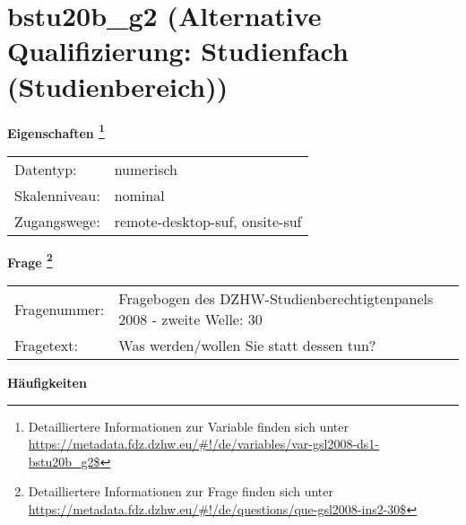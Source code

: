 
    \setcounter{footnote}{0}

    \vspace*{-1.8cm}
	\section{bstu20b\_g2 (Alternative Qualifizierung: Studienfach (Studienbereich))}
	\label{section:bstu20b_g2}



    \vspace*{0.5cm}
    \noindent\textbf{Eigenschaften
	\footnote{Detailliertere Informationen zur Variable finden sich unter
		\url{https://metadata.fdz.dzhw.eu/\#!/de/variables/var-gsl2008-ds1-bstu20b_g2$}}}\\
	\begin{tabularx}{\hsize}{@{}lX}
	Datentyp: & numerisch \\
	Skalenniveau: & nominal \\
	Zugangswege: &
	  remote-desktop-suf, 
	  onsite-suf
 \\
    \end{tabularx}



				\vspace*{0.5cm}
                \noindent\textbf{Frage
	                \footnote{Detailliertere Informationen zur Frage finden sich unter
		              \url{https://metadata.fdz.dzhw.eu/\#!/de/questions/que-gsl2008-ins2-30$}}}\\
				\begin{tabularx}{\hsize}{@{}lX}
					Fragenummer: &
					  Fragebogen des DZHW-Studienberechtigtenpanels 2008 - zweite Welle:
					  30
 \\
					Fragetext: & Was werden/wollen Sie statt dessen tun? \\
				\end{tabularx}





        		\vspace*{0.5cm}
                \noindent\textbf{Häufigkeiten}

